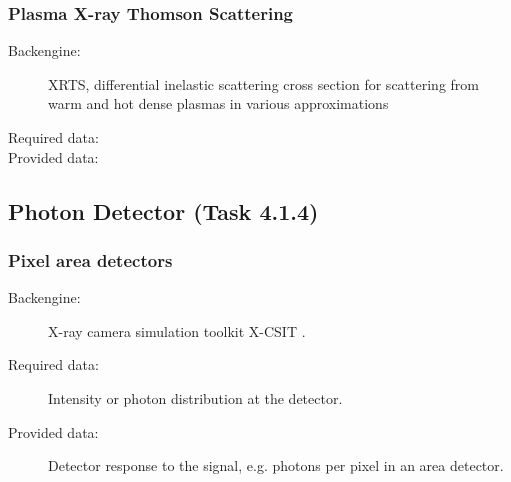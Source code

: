 \documentclass[12pt]{scrartcl}
\begin{document}
\subsubsection{Plasma X-ray Thomson Scattering}
\begin{description}
  \item[Backengine:] XRTS, differential inelastic scattering cross section for scattering from warm and hot dense plasmas in various
    approximations \cite{Gregori2009, Fortmann2009d, Fortmann2010a}
  \item[Required data:]
  \item[Provided data:]
\end{description}
%
\subsection{Photon Detector (Task 4.1.4)}
\subsubsection{Pixel area detectors}
\begin{description}
  \item[Backengine:] X-ray camera simulation toolkit X-CSIT \cite{Joy2015}.
  \item[Required data:] Intensity or photon distribution at the detector.
  \item[Provided data:] Detector response to the signal, e.g. photons per pixel in an area detector.
\end{description}

\printbibliography
\end{document}
